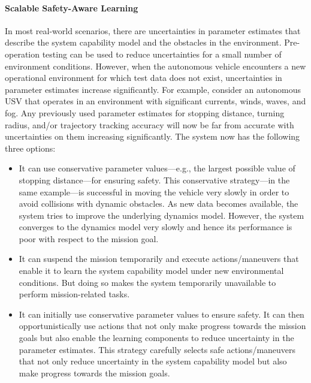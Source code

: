 \paragraph{Scalable Safety-Aware Learning}

In most real-world scenarios, there are uncertainties in parameter estimates that describe the system capability model and the obstacles  in the environment. Pre-operation testing can be used to reduce uncertainties for a small number of environment  conditions. However, when the autonomous vehicle encounters a new operational environment for which test data does not exist, uncertainties in parameter estimates increase significantly. For example, consider an autonomous USV that operates in an environment with significant currents, winds, waves, and fog. Any previously used parameter estimates for stopping distance, turning radius, and/or trajectory tracking accuracy will now be far from accurate with uncertainties on them increasing significantly. The system now has the following three options:


\begin{itemize}[leftmargin=*,topsep=3pt]
\setlength\itemsep{0em}
\item It can use conservative parameter values---e.g., the largest possible value of stopping distance---for ensuring safety. This conservative strategy---in the same example---is successful in moving the vehicle very slowly in order to avoid collisions with dynamic obstacles. As new data becomes available, the system tries to improve the underlying dynamics model. However, the system converges to the dynamics model very slowly and hence its performance is poor with respect to the mission goal.      
\item It can suspend the mission temporarily and execute actions/maneuvers that enable it to learn the system capability model under new environmental conditions. But doing so makes the system temporarily unavailable to perform mission-related tasks.
\item It can initially use conservative parameter values to ensure safety. It can then opportunistically use actions that not only make progress towards the mission goals but also enable the learning components to reduce uncertainty in the parameter estimates. This strategy carefully selects safe actions/maneuvers that not only reduce uncertainty in the system capability model but also make progress towards the mission goals. 
\end{itemize}

